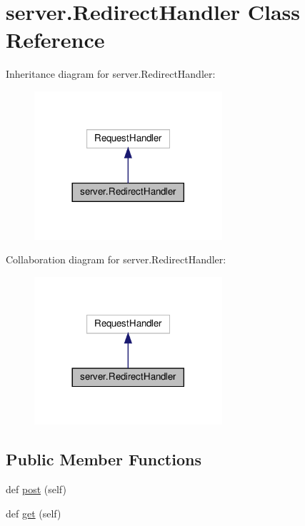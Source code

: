 \hypertarget{classserver_1_1RedirectHandler}{}\section{server.\+Redirect\+Handler Class Reference}
\label{classserver_1_1RedirectHandler}


Inheritance diagram for server.\+Redirect\+Handler\+:
\nopagebreak
\begin{figure}[H]
\begin{center}
\leavevmode
\includegraphics[width=197pt]{classserver_1_1RedirectHandler__inherit__graph}
\end{center}
\end{figure}


Collaboration diagram for server.\+Redirect\+Handler\+:
\nopagebreak
\begin{figure}[H]
\begin{center}
\leavevmode
\includegraphics[width=197pt]{classserver_1_1RedirectHandler__coll__graph}
\end{center}
\end{figure}
\subsection*{Public Member Functions}
\begin{DoxyCompactItemize}
\item 
def \hyperlink{classserver_1_1RedirectHandler_aa6080e460e55dacb9d05e4b1575d4c8a}{post} (self)
\item 
def \hyperlink{classserver_1_1RedirectHandler_a4a42888a27727c8789b15b4ce00c1856}{get} (self)
\end{DoxyCompactItemize}


